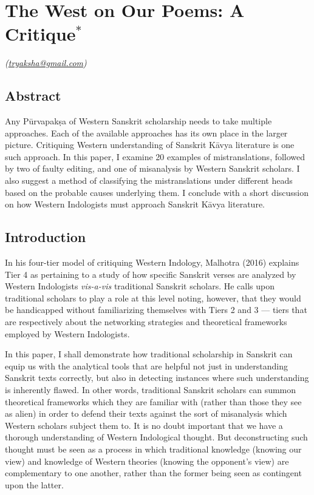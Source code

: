 \chapter[The West on Our Poems: A Critique]{The West on Our Poems: A Critique$^{*}$}\label{chapter\thechapter:begin}

\hfill{\sl(\url{tryaksha@gmail.com})}

\section*{Abstract} 

Any Pūrvapakṣa of Western Sanskrit scholarship needs to take multiple approaches. Each of the available approaches has its own place in the larger picture. Critiquing Western understanding of Sanskrit Kāvya literature is one such approach. In this paper, I examine 20 examples of mistranslations, followed by two of faulty editing, and one of misanalysis by Western Sanskrit scholars. I also suggest a method of classifying the mistranslations under different heads based on the probable causes underlying them. I conclude with a short discussion on how Western Indologists must approach Sanskrit Kāvya literature. 

\section*{Introduction}  

In his four-tier model of critiquing Western Indology, Malhotra (2016) explains Tier 4 as pertaining to a study of how specific Sanskrit verses are analyzed by Western Indologists \textsl{vis-a-vis} traditional Sanskrit scholars. He calls upon traditional scholars to play a role at this level noting, however, that they would be handicapped without familiarizing themselves with Tiers 2 and 3 --- tiers that are respectively about the networking strategies and theoretical frameworks employed by Western Indologists. 

In this paper, I shall demonstrate how traditional scholarship in Sanskrit can equip us with the analytical tools that are helpful not just in understanding Sanskrit texts correctly, but also in detecting instances where such understanding is inherently flawed. In other words, traditional Sanskrit scholars can summon theoretical frameworks which they are familiar with (rather than those they see as alien) in order to defend their texts against the sort of misanalysis which Western scholars subject them to. It is no doubt important that we have a thorough understanding of Western Indological thought. But deconstructing such thought must be seen as a process in which traditional knowledge (knowing our view) and knowledge of Western theories (knowing the opponent’s view) are complementary to one another, rather than the former being seen as contingent upon the latter. 

